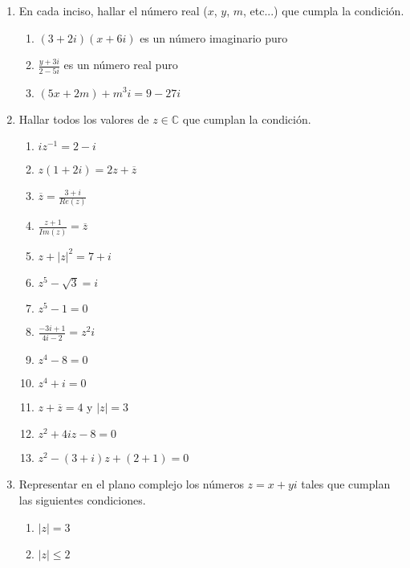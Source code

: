 \documentclass[a4paper]{article}
\newcommand{\exercise}{\item}
\newcommand{\df}[2]{\displaystyle\frac{#1}{#2}}
\newcommand{\conj}[1]{\overline{#1}}
\begin{document}
\begin{enumerate}
\begin{multicols}{2}
\begin{enumerate} [label=(\alph*)]
		\item $|z.(1+2i)|^2=|z|^2.|1+2i|^2$
		\item $z+\conj{z} \in \mathbb{R}$
		\item $z-\conj{z} \not\in \mathbb{R}$
		\item $|z-w|=d(z,w)$
		\item $(z-\conj{z})^2=-4Im(z)^2$
	\end{enumerate}
	\end{multicols}
	\exercise En cada inciso, hallar el número real ($x$, $y$, $m$, etc...) que cumpla la condición.
	\begin{enumerate} [label=(\alph*)]
		\item $(3+2i)(x+6i)$ es un número imaginario puro
		\item $\df{y+3i}{2-5i}$ es un número real puro
		\item $(5x+2m)+m^3i = 9-27i$
	\end{enumerate}
	\exercise Hallar todos los valores de $z \in \mathbb{C}$ que cumplan la condición.
	\begin{multicols}{2}
	\begin{enumerate} [label=(\alph*)]
		\item $iz^{-1}=2-i$
		\item $z(1+2i)=2z+\conj{z}$
		\item $\conj{z}=\df{3+i}{Re(z)}$
		\item $\df{z+1}{Im(z)}=\conj{z}$
		\item $z+|z|^2=7+i$
		\item $z^5-\sqrt{3}=i$
		\item $z^5-1=0$
		\item $\df{-3i+1}{4i-2}=z^2i$
		\item $z^4-8=0$
		\item $z^4+i=0$
		\item $z+\conj{z}=4$ y $|z|=3$
		\item $z^2+4iz-8=0$
		\item $z^2-(3+i)z+(2+1)=0$
	\end{enumerate}
	\end{multicols}
	\exercise Representar en el plano complejo los números $z=x+yi$ tales que cumplan las siguientes condiciones.
	\begin{multicols}{2}
	\begin{enumerate} [label=(\alph*)]
		\item $|z|=3$
		\item $|z|\leq 2$

\end{enumerate}
\end{multicols}
\end{enumerate}
\end{document}

